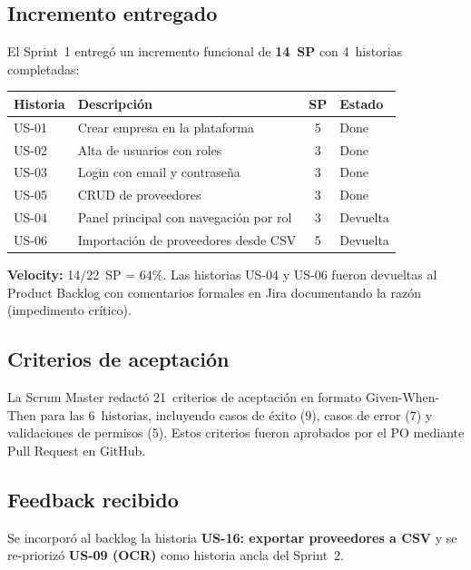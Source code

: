 \documentclass[11pt,a4paper]{article}
\begin{document}
\subsection{Incremento entregado}

El Sprint~1 entregó un incremento funcional de \textbf{14~SP} con 4~historias completadas:

\begin{center}
\begin{tabular}{llcl}
\toprule
\textbf{Historia} & \textbf{Descripción} & \textbf{SP} & \textbf{Estado} \\
\midrule
US-01 & Crear empresa en la plataforma & 5 & \textcolor{green!60!black}{Done} \\
US-02 & Alta de usuarios con roles & 3 & \textcolor{green!60!black}{Done} \\
US-03 & Login con email y contraseña & 3 & \textcolor{green!60!black}{Done} \\
US-05 & CRUD de proveedores & 3 & \textcolor{green!60!black}{Done} \\
\midrule
US-04 & Panel principal con navegación por rol & 3 & \textcolor{red!70!black}{Devuelta} \\
US-06 & Importación de proveedores desde CSV & 5 & \textcolor{red!70!black}{Devuelta} \\
\bottomrule
\end{tabular}
\end{center}

\textbf{Velocity:} 14/22~SP = 64\%. Las historias US-04 y US-06 fueron devueltas al Product Backlog con comentarios formales en Jira documentando la razón (impedimento crítico).

\subsection{Criterios de aceptación}

La Scrum Master redactó 21~criterios de aceptación en formato Given-When-Then para las 6~historias, incluyendo casos de éxito (9), casos de error (7) y validaciones de permisos (5). Estos criterios fueron aprobados por el PO mediante Pull Request en GitHub.

\subsection{Feedback recibido}
Se incorporó al backlog la historia \textbf{US-16: exportar proveedores a CSV} y se re-priorizó \textbf{US-09 (OCR)} como historia ancla del Sprint~2.
\end{document}
